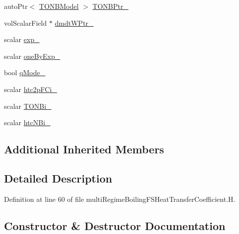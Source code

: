 \begin{DoxyCompactItemize}
\item 
auto\+Ptr$<$ \hyperlink{classFoam_1_1TONBModel}{T\+O\+N\+B\+Model} $>$ \hyperlink{classFoam_1_1FSHeatTransferCoefficientModels_1_1multiRegimeBoiling_adae4cc1441e333a7d78bafb69db13d92}{T\+O\+N\+B\+Ptr\+\_\+}
\item 
vol\+Scalar\+Field $\ast$ \hyperlink{classFoam_1_1FSHeatTransferCoefficientModels_1_1multiRegimeBoiling_ac0faf076a0c692fe45fb2b3fb7d62214}{dmdt\+W\+Ptr\+\_\+}
\item 
scalar \hyperlink{classFoam_1_1FSHeatTransferCoefficientModels_1_1multiRegimeBoiling_a1bfcb112440d1e03115c95d8f7fa6b1b}{exp\+\_\+}
\item 
scalar \hyperlink{classFoam_1_1FSHeatTransferCoefficientModels_1_1multiRegimeBoiling_acee358bcf72043d5bf26d252ab1cc571}{one\+By\+Exp\+\_\+}
\item 
bool \hyperlink{classFoam_1_1FSHeatTransferCoefficientModels_1_1multiRegimeBoiling_a4df8fbbb186fb7c5bba1143c3416bb74}{q\+Mode\+\_\+}
\item 
scalar \hyperlink{classFoam_1_1FSHeatTransferCoefficientModels_1_1multiRegimeBoiling_a47ed18388c29c90b26f979fb75e74055}{htc2p\+F\+Ci\+\_\+}
\item 
scalar \hyperlink{classFoam_1_1FSHeatTransferCoefficientModels_1_1multiRegimeBoiling_aafb292db1c539da049319617d7533314}{T\+O\+N\+Bi\+\_\+}
\item 
scalar \hyperlink{classFoam_1_1FSHeatTransferCoefficientModels_1_1multiRegimeBoiling_a8f44c8131b7ae470b9082bb7c8d2a852}{htc\+N\+Bi\+\_\+}
\end{DoxyCompactItemize}
\subsection*{Additional Inherited Members}


\subsection{Detailed Description}


Definition at line 60 of file multi\+Regime\+Boiling\+F\+S\+Heat\+Transfer\+Coefficient.\+H.



\subsection{Constructor \& Destructor Documentation}
\mbox{\label{classFoam_1_1FSHeatTransferCoefficientModels_1_1multiRegimeBoiling_aeb615903bb3ddaa54f52ddf17d80d603}} 
